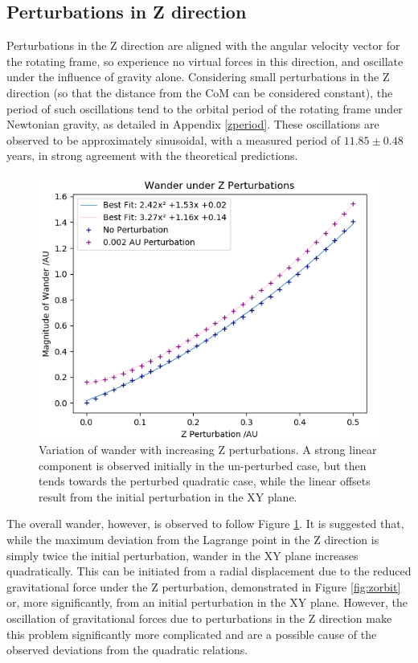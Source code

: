 \documentclass[11pt, a4paper,twocolumn]{article} %
\begin{document}
\subsection{Perturbations in Z direction} \label{3D}
Perturbations in the Z direction are aligned with the angular velocity vector for the rotating frame, so experience no virtual forces in this direction, and oscillate under the influence of gravity alone. Considering small perturbations in the Z direction (so that the distance from the CoM can be considered constant), the period of such oscillations tend to the orbital period of the rotating frame under Newtonian gravity, as detailed in Appendix \ref{zperiod}. These oscillations are observed to be approximately sinusoidal, with a measured period of $11.85 \pm 0.48$ years, in strong agreement with the theoretical predictions.

\begin{figure}
	\centering
	\includegraphics[width=0.8\linewidth]{Figures/z_perturbations5c}
	\caption{Variation of wander with increasing Z perturbations. A strong linear component is observed initially in the un-perturbed case, but then tends towards the perturbed quadratic case, while the linear offsets result from the initial perturbation in the XY plane.}
	\label{fig:zwander}
\end{figure}

The overall wander, however, is observed to follow Figure \ref{fig:zwander}.
It is suggested that, while the maximum deviation from the Lagrange point in the Z direction is simply twice the initial perturbation, wander in the XY plane increases quadratically. This can be initiated from a radial displacement due to the reduced gravitational force  under the Z perturbation, demonstrated in Figure \ref{fig:zorbit} or, more significantly, from an initial perturbation in the XY plane. However, the oscillation of gravitational forces due to perturbations in the Z direction make this problem significantly more complicated and are a possible cause of the observed deviations from the quadratic relations.
\end{document}
